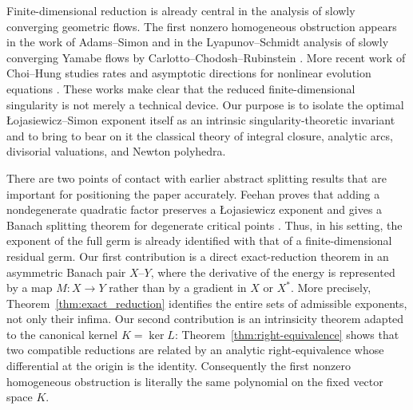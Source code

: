 \documentclass[11pt]{article}
\theoremstyle{definition}
\theoremstyle{remark}
\begin{document}
Finite-dimensional reduction is already central in the analysis of slowly converging geometric flows. The first nonzero homogeneous obstruction appears in the work of Adams--Simon and in the Lyapunov--Schmidt analysis of slowly converging Yamabe flows by Carlotto--Chodosh--Rubinstein \cite{AdamsSimon1988,CCR2015}. More recent work of Choi--Hung studies rates and asymptotic directions for nonlinear evolution equations \cite{ChoiHung2023,ChoiHung2024}. These works make clear that the reduced finite-dimensional singularity is not merely a technical device. Our purpose is to isolate the optimal \L{}ojasiewicz--Simon exponent itself as an intrinsic singularity-theoretic invariant and to bring to bear on it the classical theory of integral closure, analytic arcs, divisorial valuations, and Newton polyhedra.

There are two points of contact with earlier abstract splitting results that are important for positioning the paper accurately. Feehan proves that adding a nondegenerate quadratic factor preserves a \L{}ojasiewicz exponent and gives a Banach splitting theorem for degenerate critical points \cite[Lemma~3.3 and Theorem~5]{Feehan2020}. Thus, in his setting, the exponent of the full germ is already identified with that of a finite-dimensional residual germ. Our first contribution is a direct exact-reduction theorem in an asymmetric Banach pair $X$--$Y$, where the derivative of the energy is represented by a map $M:X\to Y$ rather than by a gradient in $X$ or $X^*$. More precisely, Theorem~\ref{thm:exact_reduction} identifies the entire sets of admissible exponents, not only their infima. Our second contribution is an intrinsicity theorem adapted to the canonical kernel $K=\ker L$: Theorem~\ref{thm:right-equivalence} shows that two compatible reductions are related by an analytic right-equivalence whose differential at the origin is the identity. Consequently the first nonzero homogeneous obstruction is literally the same polynomial on the fixed vector space $K$.
\end{document}
